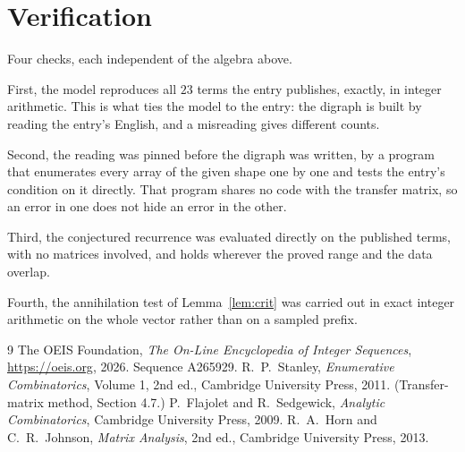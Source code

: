 \documentclass[11pt,a4paper]{article}
\theoremstyle{plain}
\theoremstyle{definition}
\begin{document}
\section{Verification}

Four checks, each independent of the algebra above.

First, the model reproduces all $23$ terms the entry publishes, exactly, in integer
arithmetic. This is what ties the model to the entry: the digraph is built by reading the
entry's English, and a misreading gives different counts.

Second, the reading was pinned before the digraph was written, by a program that enumerates
every array of the given shape one by one and tests the entry's condition on it directly. That program shares no code with the transfer matrix, so an error in one does not
hide an error in the other.

Third, the conjectured recurrence was evaluated directly on the published terms, with no
matrices involved, and holds wherever the proved range and the data overlap.

Fourth, the annihilation test of Lemma~\ref{lem:crit} was carried out in exact integer
arithmetic on the whole vector rather than on a sampled prefix.

\begin{thebibliography}{9}
 The OEIS Foundation, \emph{The On-Line Encyclopedia of Integer
Sequences}, \url{https://oeis.org}, 2026. Sequence A265929.
 R.~P.~Stanley, \emph{Enumerative Combinatorics}, Volume 1, 2nd ed.,
Cambridge University Press, 2011. (Transfer-matrix method, Section 4.7.)
 P.~Flajolet and R.~Sedgewick, \emph{Analytic Combinatorics}, Cambridge
University Press, 2009.
 R.~A.~Horn and C.~R.~Johnson, \emph{Matrix Analysis}, 2nd ed., Cambridge
University Press, 2013.
\end{thebibliography}
\end{document}

